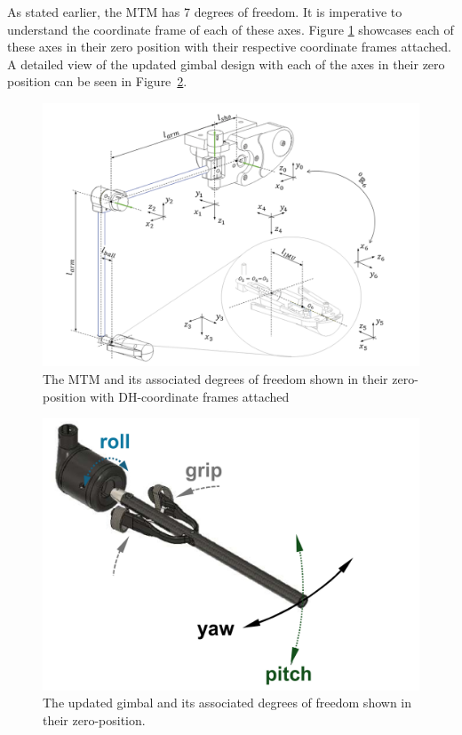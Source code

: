 As stated earlier, the MTM has 7 degrees of freedom. It is imperative to understand the coordinate frame of each of these axes. Figure \ref{fig:MTMcoords} showcases each of these axes in their zero position with their respective coordinate frames attached. A detailed view of the updated gimbal design with each of the axes in their zero position can be seen in Figure~\ref{fig:GimbalCoords}.

\begin{figure}[H]
    \centering
    \includegraphics[width=0.8\linewidth]{figures/MTMcoords.png}
    \caption{The MTM and its associated degrees of freedom shown in their zero-position with DH-coordinate frames attached \cite{walder2022design}}
    \label{fig:MTMcoords}
\end{figure}

\begin{figure}[H]
    \centering
    \includegraphics[width=0.8\linewidth]{figures/Gimbalcoords.png}
    \caption{The updated gimbal and its associated degrees of freedom shown in their zero-position. \cite{Messner2025Teleoperative}}
    \label{fig:GimbalCoords}
\end{figure}

